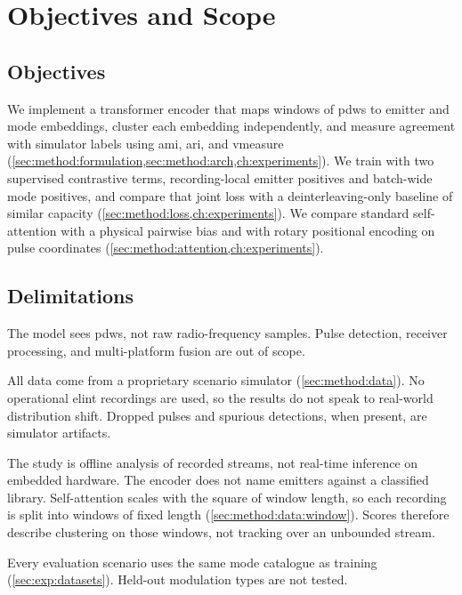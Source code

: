 \section{Objectives and Scope}\label{sec:intro:scope}

\subsection{Objectives}\label{sec:intro:objectives}

We implement a transformer encoder that maps windows of \glspl{pdw} to emitter and mode embeddings, cluster each embedding independently, and measure agreement with simulator labels using \gls{ami}, \gls{ari}, and \gls{vmeasure} (\cref{sec:method:formulation,sec:method:arch,ch:experiments}).
We train with two supervised contrastive terms, recording-local emitter positives and batch-wide mode positives, and compare that joint loss with a deinterleaving-only baseline of similar capacity (\cref{sec:method:loss,ch:experiments}).
We compare standard self-attention with a physical pairwise bias and with rotary positional encoding on pulse coordinates (\cref{sec:method:attention,ch:experiments}).

\subsection{Delimitations}\label{sec:intro:delimitations}

The model sees \glspl{pdw}, not raw radio-frequency samples.
Pulse detection, receiver processing, and multi-platform fusion are out of scope.

All data come from a proprietary scenario simulator (\cref{sec:method:data}).
No operational \gls{elint} recordings are used, so the results do not speak to real-world distribution shift.
Dropped pulses and spurious detections, when present, are simulator artifacts.

The study is offline analysis of recorded streams, not real-time inference on embedded hardware.
The encoder does not name emitters against a classified library.
Self-attention scales with the square of window length, so each recording is split into windows of fixed length (\cref{sec:method:data:window}).
Scores therefore describe clustering on those windows, not tracking over an unbounded stream.

Every evaluation scenario uses the same mode catalogue as training (\cref{sec:exp:datasets}).
Held-out modulation types are not tested.
